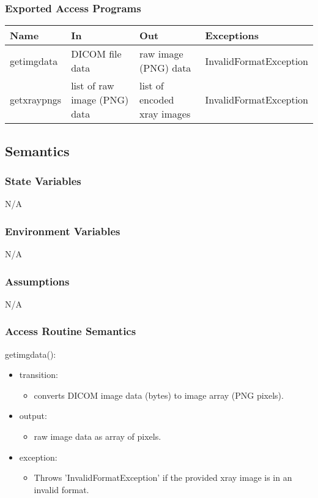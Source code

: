 \documentclass[12pt, titlepage]{article}
\begin{document}
\subsubsection{Exported Access Programs}

\begin{center}
\begin{tabular}{p{3cm} p{4cm} p{4cm} p{5cm}}
\hline
\textbf{Name} & \textbf{In} & \textbf{Out} & \textbf{Exceptions} \\
\hline
getimgdata & DICOM file data & raw image (PNG) data & InvalidFormatException \\
getxraypngs & list of raw image (PNG) data & list of encoded xray images & InvalidFormatException \\
\hline
\end{tabular}
\end{center}

\subsection{Semantics}

\subsubsection{State Variables}
N/A
\subsubsection{Environment Variables}
N/A
\subsubsection{Assumptions}
N/A
\subsubsection{Access Routine Semantics}

\noindent getimgdata():
\begin{itemize}
\item transition: \begin{itemize}
    \item converts DICOM image data (bytes) to image array (PNG pixels).
\end{itemize}
\item output: \begin{itemize}
    \item raw image data as array of pixels.
\end{itemize}
\item exception: \begin{itemize}
    \item Throws 'InvalidFormatException' if the provided xray image is in an invalid format.
\end{itemize}
\end{itemize}
\end{document}
